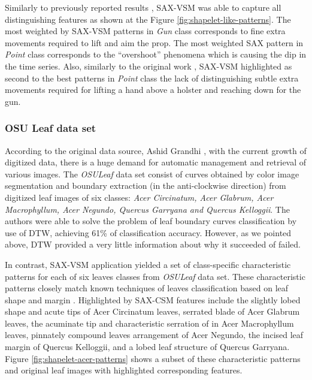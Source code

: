 Similarly to previously reported results \cite{citeulike:7344347, citeulike:11345338}, 
SAX-VSM was able to capture all distinguishing features as shown at the 
Figure \ref{fig:shapelet-like-patterns}. The most weighted by SAX-VSM patterns in 
\textit{Gun} class corresponds to fine extra movements required to lift and aim the prop. 
The most weighted SAX pattern in \textit{Point} class corresponds to the ``overshoot''
phenomena which is causing the dip in the time series. 
Also, similarly to the original work \cite{DBLP:conf/sdm/RatanamahatanaK04}, SAX-VSM highlighted as second to the best
patterns in \textit{Point} class the lack of distinguishing subtle extra movements required
for lifting a hand above a holster and reaching down for the gun.

\subsubsection{OSU Leaf data set}
According to the original data source, Ashid Grandhi \cite{citeulike:12563798}, with the current growth of
digitized data, there is a huge demand for automatic management and retrieval of various images. The
\textit{OSULeaf} data set consist of curves obtained by color image segmentation and boundary
extraction (in the anti-clockwise direction) from digitized leaf images of six classes: \textit{Acer
Circinatum, Acer Glabrum, Acer Macrophyllum, Acer Negundo, Quercus Garryana and Quercus Kelloggii}.
The authors were able to solve the problem of leaf boundary curves classification by use of DTW, 
achieving 61\% of classification accuracy. However, as we pointed above, DTW provided a
very little information about why it succeeded of failed. 

In contrast, SAX-VSM application yielded a set of class-specific characteristic patterns for each of
six leaves classes from \textit{OSULeaf} data set. These characteristic patterns closely match
known techniques of leaves classification based on leaf shape and margin \cite{citeulike:12134192}. 
Highlighted by SAX-CSM features include the slightly lobed shape and acute tips of
Acer Circinatum leaves, serrated blade of Acer Glabrum leaves, the acuminate tip and characteristic
serration of in Acer Macrophyllum leaves, pinnately compound leaves arrangement of Acer Negundo, the
incised leaf margin of Quercus Kelloggii, and a lobed leaf structure of Quercus Garryana. 
Figure \ref{fig:shapelet-acer-patterns} shows a subset of these characteristic patterns and original
leaf images with highlighted corresponding features.

